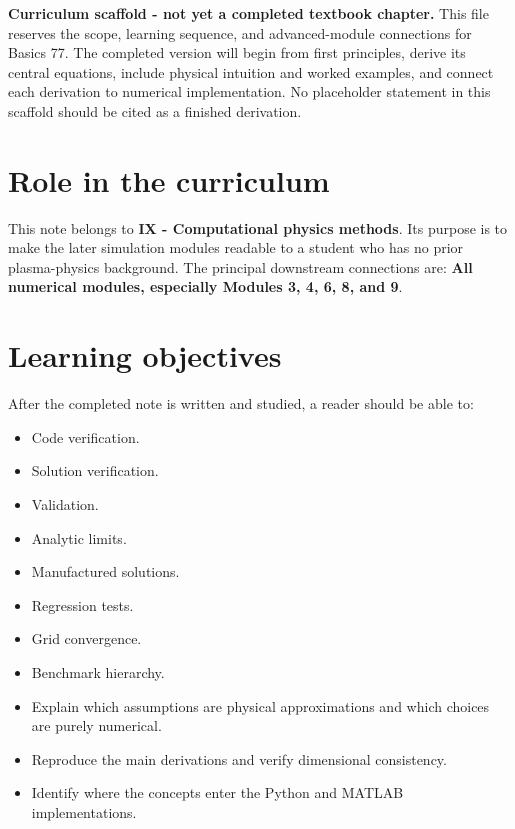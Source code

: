 \documentclass[11pt]{article}
\begin{document}

\begin{overviewbox}
\textbf{Curriculum scaffold - not yet a completed textbook chapter.} This file reserves the scope, learning sequence, and advanced-module connections for Basics 77. The completed version will begin from first principles, derive its central equations, include physical intuition and worked examples, and connect each derivation to numerical implementation. No placeholder statement in this scaffold should be cited as a finished derivation.
\end{overviewbox}

\ProjectTOC

\section{Role in the curriculum}
This note belongs to \textbf{IX - Computational physics methods}. Its purpose is to make the later simulation modules readable to a student who has no prior plasma-physics background. The principal downstream connections are: \textbf{All numerical modules, especially Modules 3, 4, 6, 8, and 9}.

\section{Learning objectives}
After the completed note is written and studied, a reader should be able to:
\begin{itemize}[leftmargin=1.6em]
\item Code verification.
\item Solution verification.
\item Validation.
\item Analytic limits.
\item Manufactured solutions.
\item Regression tests.
\item Grid convergence.
\item Benchmark hierarchy.
\item Explain which assumptions are physical approximations and which choices are purely numerical.
\item Reproduce the main derivations and verify dimensional consistency.
\item Identify where the concepts enter the Python and MATLAB implementations.
\end{itemize}
\end{document}
